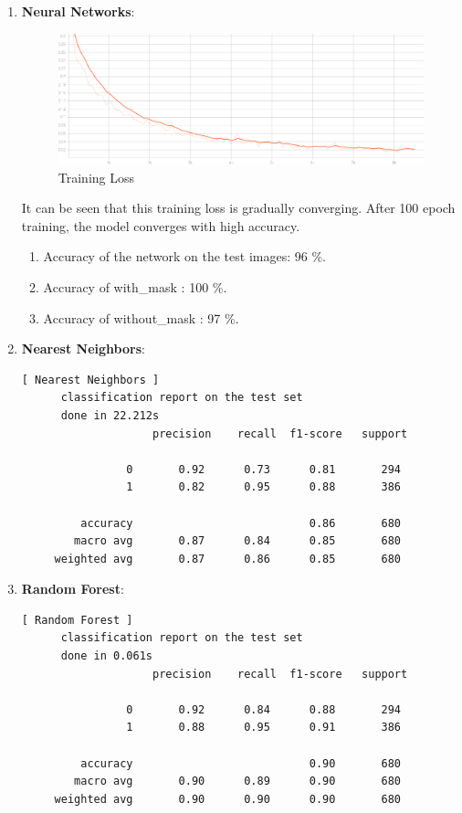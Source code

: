 \documentclass{article}
\begin{document}
  \begin{enumerate}
    \item \textbf{Neural Networks}:
          \begin{figure}[!htbp]
            \centering
            \includegraphics[width=17cm]{trainingloss.eps}
            \caption{Training Loss}
          \end{figure}
          It can be seen that this training loss is gradually converging.
          After 100 epoch training, the model converges with high accuracy.
          \begin{enumerate}
            \item Accuracy of the network on the test images: 96 \%.
            \item Accuracy of with\_mask : 100 \%.
            \item Accuracy of without\_mask : 97 \%.
          \end{enumerate}
    \item \textbf{Nearest Neighbors}:\begin{lstlisting}
[ Nearest Neighbors ]
      classification report on the test set
      done in 22.212s
                    precision    recall  f1-score   support

                0       0.92      0.73      0.81       294
                1       0.82      0.95      0.88       386

         accuracy                           0.86       680
        macro avg       0.87      0.84      0.85       680
     weighted avg       0.87      0.86      0.85       680
    \end{lstlisting}
    \item \textbf{Random Forest}:\begin{lstlisting}
[ Random Forest ]
      classification report on the test set
      done in 0.061s
                    precision    recall  f1-score   support

                0       0.92      0.84      0.88       294
                1       0.88      0.95      0.91       386

         accuracy                           0.90       680
        macro avg       0.90      0.89      0.90       680
     weighted avg       0.90      0.90      0.90       680
    \end{lstlisting}

  \end{enumerate}
\end{document}
